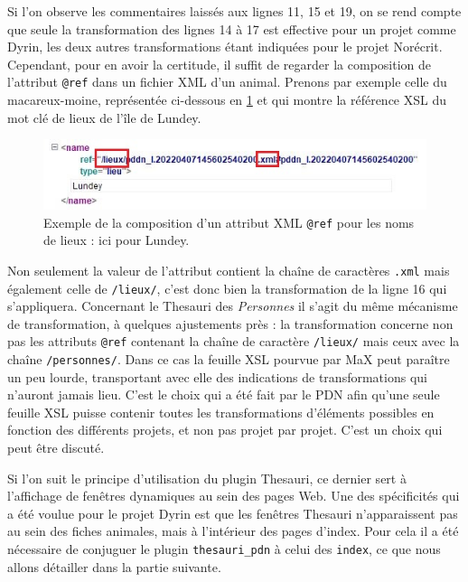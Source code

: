 \documentclass[a4paper,12pt,twoside]{book}
\begin{document}
Si l'on observe les commentaires laissés aux lignes 11, 15 et 19, on se rend compte que seule la transformation des lignes 14 à 17 est effective pour un projet comme Dyrin, les deux autres transformations étant indiquées pour le projet Norécrit. Cependant, pour en avoir la certitude, il suffit de regarder la composition de l'attribut \texttt{@ref} dans un fichier XML d'un animal. Prenons par exemple celle du macareux-moine, représentée ci-dessous en \ref{macareux} et qui montre la référence \acrshort{XSL} du mot clé de lieux de l'île de Lundey.

\begin{figure}[H]
    \centering
    \includegraphics[width=12cm]{img/partie_3/lundey_xml.JPG}
    \caption{Exemple de la composition d'un attribut XML \texttt{@ref} pour les noms de lieux : ici pour Lundey.}
    \label{macareux}
\end{figure}
Non seulement la valeur de l'attribut contient la chaîne de caractères \texttt{.xml} mais également celle de \texttt{/lieux/}, c'est donc bien la transformation de la ligne 16 qui s'appliquera. Concernant le Thesauri des \textit{Personnes} il s'agit du même mécanisme de transformation, à quelques ajustements près : la transformation concerne non pas les attributs \texttt{@ref} contenant la chaîne de caractère \texttt{/lieux/} mais ceux avec la chaîne \texttt{/personnes/}. Dans ce cas la feuille \acrshort{XSL} pourvue par MaX peut paraître un peu lourde, transportant avec elle des indications de transformations qui n'auront jamais lieu. C'est le choix qui a été fait par le \acrshort{PDN} afin qu'une seule feuille \acrshort{XSL} puisse contenir toutes les transformations d'éléments possibles en fonction des différents projets, et non pas projet par projet. C'est un choix qui peut être discuté.

Si l'on suit le principe d'utilisation du plugin Thesauri, ce dernier sert à l'affichage de fenêtres dynamiques au sein des pages Web. Une des spécificités qui a été voulue pour le projet Dyrin est que les fenêtres Thesauri n'apparaissent pas au sein des fiches animales, mais à l'intérieur des pages d'index. Pour cela il a été nécessaire de conjuguer le plugin \texttt{thesauri\_pdn} à celui des \texttt{index}, ce que nous allons détailler dans la partie suivante.
\end{document}
